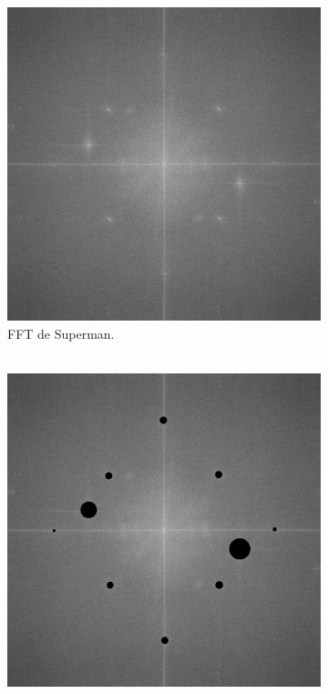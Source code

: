 \documentclass[11pt,twocolumn,twoside]{opticajnl}
\begin{document}
\begin{figure}[h]
    \centering
         \begin{subfigure}[h]{0.49\linewidth}
            \centering
            \includegraphics[width=\textwidth]{Figuras/FFT of superman.png}
            \caption{FFT de Superman. \\
            $~$} 
         \end{subfigure}
         \begin{subfigure}[h]{0.49\linewidth}
            \centering
            \includegraphics[width=\textwidth]{Figuras/FFT of superman_process.png}

\end{subfigure}
\end{figure}
\end{document}
